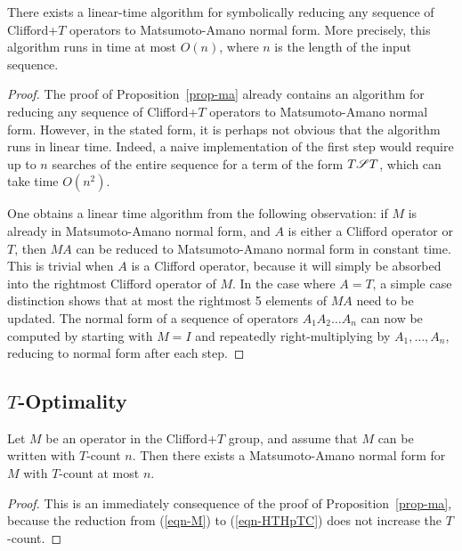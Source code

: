 \begin{corollary}\label{cor-efficient}
  There exists a linear-time algorithm for symbolically reducing any sequence of Clifford+$T$
  operators to Matsumoto-Amano normal form. More precisely, this algorithm runs in time at most
  $O(n)$, where $n$ is the length of the input sequence.
\end{corollary}

\begin{proof}
  The proof of Proposition~\vref{prop-ma} already contains an algorithm for reducing any sequence of
  Clifford+$T$ operators to Matsumoto-Amano normal form. However, in the stated form, it is perhaps
  not obvious that the algorithm runs in linear time. Indeed, a naive implementation of the first
  step would require up to $n$ searches of the entire sequence for a term of the form $T\mathscr{S} T$,
  which can take time $O(n^2)$.

  One obtains a linear time algorithm from the following observation: if $M$ is already in
  Matsumoto-Amano normal form, and $A$ is either a Clifford operator or $T$, then $MA$ can be
  reduced to Matsumoto-Amano normal form in constant time. This is trivial when $A$ is a Clifford
  operator, because it will simply be absorbed into the rightmost Clifford operator of $M$. In the
  case where $A=T$, a simple case distinction shows that at most the rightmost 5 elements of $MA$
  need to be updated. The normal form of a sequence of operators $A_1A_2\ldots A_n$ can now be
  computed by starting with $M=I$ and repeatedly right-multiplying by $A_1,\ldots,A_n$, reducing to
  normal form after each step.
\end{proof}


\subsection{$T$-Optimality} %
\label{sub:_t_optimality}
\begin{corollary}
  Let $M$ be an operator in the Clifford+$T$ group, and assume that $M$ can be written with
  $T$-count $n$. Then there exists a Matsumoto-Amano normal form for $M$ with $T$-count at most $n$.
\end{corollary}

\begin{proof}
  This is an immediately consequence of the proof of Proposition~\vref{prop-ma}, because the
  reduction from (\vref{eqn-M}) to (\vref{eqn-HTHpTC}) does not increase the $T$-count.
\end{proof}

